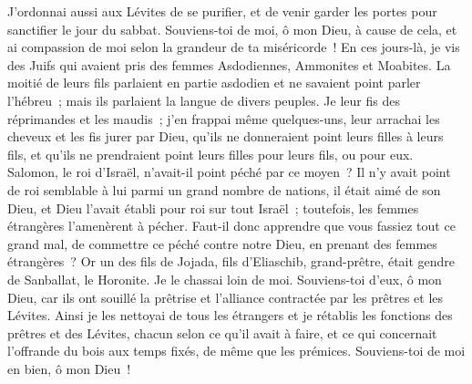 \begin{multicols}{2}
J'ordonnai aussi aux Lévites de se purifier, et de venir garder les portes pour sanctifier le jour du sabbat. Souviens-toi de moi, ô mon Dieu, à cause de cela, et ai compassion de moi selon la grandeur de ta miséricorde~!
En ces jours-là, je vis des Juifs qui avaient pris des femmes Asdodiennes, Ammonites et Moabites.
La moitié de leurs fils parlaient en partie asdodien et ne savaient point parler l'hébreu~; mais ils parlaient la langue de divers peuples.
Je leur fis des réprimandes et les maudis~; j'en frappai même quelques-uns, leur arrachai les cheveux et les fis jurer par Dieu, qu'ils ne donneraient point leurs filles à leurs fils, et qu'ils ne prendraient point leurs filles pour leurs fils, ou pour eux.
Salomon, le roi d'Israël, n'avait-il point péché par ce moyen~? Il n'y avait point de roi semblable à lui parmi un grand nombre de nations, il était aimé de son Dieu, et Dieu l'avait établi pour roi sur tout Israël~; toutefois, les femmes étrangères l'amenèrent à pécher.
Faut-il donc apprendre que vous fassiez tout ce grand mal, de commettre ce péché contre notre Dieu, en prenant des femmes étrangères~?
Or un des fils de Jojada, fils d'Eliaschib, grand-prêtre, était gendre de Sanballat, le Horonite. Je le chassai loin de moi.
Souviens-toi d'eux, ô mon Dieu, car ils ont souillé la prêtrise et l'alliance contractée par les prêtres et les Lévites.
Ainsi je les nettoyai de tous les étrangers et je rétablis les fonctions des prêtres et des Lévites, chacun selon ce qu'il avait à faire,
et ce qui concernait l'offrande du bois aux temps fixés, de même que les prémices. Souviens-toi de moi en bien, ô mon Dieu~!
\PPE{}
\end{multicols}
